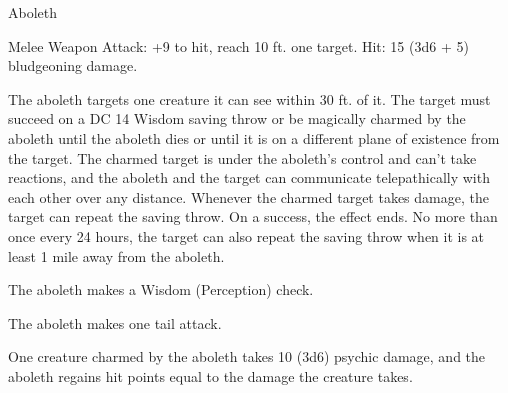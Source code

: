 \begin{monsterbox}{Aboleth}
\begin{monsteraction}[Tentacle]
\end{monsteraction}
\begin{monsteraction}[Tail]
Melee Weapon Attack: +9 to hit, reach 10 ft. one target. Hit: 15 (3d6 + 5) bludgeoning damage.
\end{monsteraction}
\begin{monsteraction}
The aboleth targets one creature it can see within 30 ft. of it. The target must succeed on a DC 14 Wisdom saving throw or be magically charmed by the aboleth until the aboleth dies or until it is on a different plane of existence from the target. The charmed target is under the aboleth's control and can't take reactions, and the aboleth and the target can communicate telepathically with each other over any distance.
Whenever the charmed target takes damage, the target can repeat the saving throw. On a success, the effect ends. No more than once every 24 hours, the target can also repeat the saving throw when it is at least 1 mile away from the aboleth.
\end{monsteraction}
\begin{monsteraction}[Detect]
The aboleth makes a Wisdom (Perception) check.
\end{monsteraction}
\begin{monsteraction}
The aboleth makes one tail attack.
\end{monsteraction}
\begin{monsteraction}
One creature charmed by the aboleth takes 10 (3d6) psychic damage, and the aboleth regains hit points equal to the damage the creature takes.
\end{monsteraction}
\end{monsterbox}